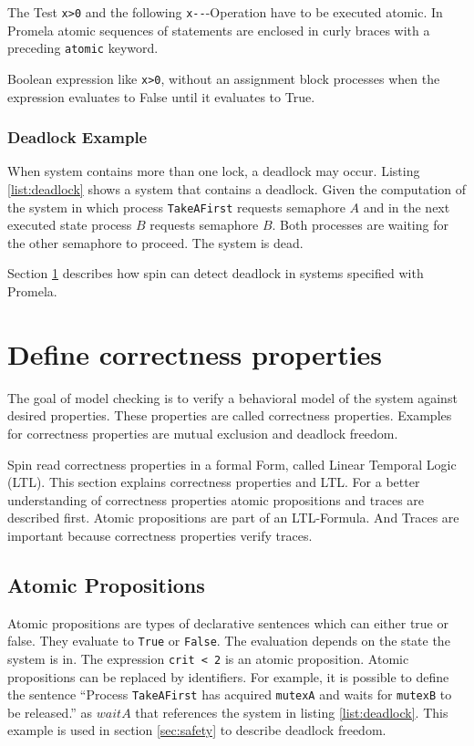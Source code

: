 \documentclass[a4paper, twoside]{article}
\begin{document}
The Test \verb|x>0| and the following \verb|x--|-Operation have to be executed atomic. In Promela atomic sequences of statements are enclosed in curly braces with a preceding \verb|atomic| keyword.

Boolean expression like \verb|x>0|, without an assignment block processes when the expression evaluates to False until it evaluates to True.

\subsubsection{Deadlock Example}
\label{sec:deadlock}

When system contains more than one lock, a deadlock may occur. Listing \ref{list:deadlock} shows a system that contains a deadlock. Given the computation of the system in which process \texttt{TakeAFirst} requests semaphore $A$ and in the next executed state process $B$ requests semaphore $B$. Both processes are waiting for the other semaphore to proceed. The system is dead.



Section \ref{sec:ltl} describes how spin can detect deadlock in systems specified with Promela.

\section{Define correctness properties}
\label{sec:ltl}

The goal of model checking is to verify a behavioral model of the system against desired properties. These properties are called correctness properties. Examples for correctness properties are mutual exclusion and deadlock freedom. 

Spin read correctness properties in a formal Form, called Linear Temporal Logic (LTL). This section explains correctness properties and LTL. For a better understanding of correctness properties atomic propositions and traces are described first. Atomic propositions are part of an LTL-Formula. And Traces are important because correctness properties verify traces.

\subsection{Atomic Propositions}
\label{sec:atomicpropositions}

Atomic propositions are types of declarative sentences which can either true or false. They evaluate to \verb|True| or \verb|False|. The evaluation depends on the state the system is in. The expression \verb|crit < 2| is an atomic proposition. Atomic propositions can be replaced by identifiers. For example, it is possible to define the sentence ``Process \verb|TakeAFirst| has acquired \verb|mutexA| and waits for \verb|mutexB| to be released.'' as $waitA$  that references the system in listing \ref{list:deadlock}. This example is used in section \ref{sec:safety} to describe deadlock freedom.
 
\end{document}
